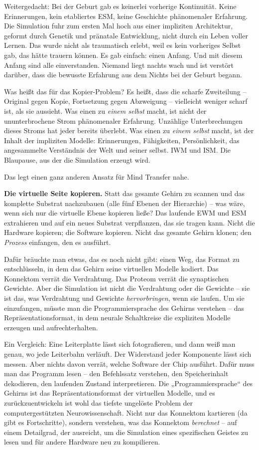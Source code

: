 \documentclass[11pt, twoside, openright]{book}
\begin{document}
Weitergedacht: Bei der Geburt gab es keinerlei vorherige Kontinuität. Keine Erinnerungen, kein etabliertes ESM, keine Geschichte phänomenaler Erfahrung. Die Simulation fuhr zum ersten Mal hoch aus einer impliziten Architektur, geformt durch Genetik und pränatale Entwicklung, nicht durch ein Leben voller Lernen. Das wurde nicht als traumatisch erlebt, weil es kein vorheriges Selbst gab, das hätte trauern können. Es gab einfach: einen Anfang. Und mit diesem Anfang sind alle einverstanden. Niemand liegt nachts wach und ist verstört darüber, dass die bewusste Erfahrung aus dem Nichts bei der Geburt begann.

Was heißt das für das Kopier-Problem? Es heißt, dass die scharfe Zweiteilung -- Original gegen Kopie, Fortsetzung gegen Abzweigung -- vielleicht weniger scharf ist, als sie aussieht. Was einen zu \textit{einem selbst} macht, ist nicht der ununterbrochene Strom phänomenaler Erfahrung. Unzählige Unterbrechungen dieses Stroms hat jeder bereits überlebt. Was einen zu \textit{einem selbst} macht, ist der Inhalt der impliziten Modelle: Erinnerungen, Fähigkeiten, Persönlichkeit, das angesammelte Verständnis der Welt und seiner selbst. IWM und ISM. Die Blaupause, aus der die Simulation erzeugt wird.

Das legt einen ganz anderen Ansatz für Mind Transfer nahe.

\textbf{Die virtuelle Seite kopieren.} Statt das gesamte Gehirn zu scannen und das komplette Substrat nachzubauen (alle fünf Ebenen der Hierarchie) -- was wäre, wenn sich nur die virtuelle Ebene kopieren ließe? Das laufende EWM und ESM extrahieren und auf ein neues Substrat verpflanzen, das sie tragen kann. Nicht die Hardware kopieren; die Software kopieren. Nicht das gesamte Gehirn klonen; den \textit{Prozess} einfangen, den es ausführt.

Dafür bräuchte man etwas, das es noch nicht gibt: einen Weg, das Format zu entschlüsseln, in dem das Gehirn seine virtuellen Modelle kodiert. Das Konnektom verrät die Verdrahtung. Das Proteom verrät die synaptischen Gewichte. Aber die Simulation ist nicht die Verdrahtung oder die Gewichte -- sie ist das, was Verdrahtung und Gewichte \textit{hervorbringen}, wenn sie laufen. Um sie einzufangen, müsste man die Programmiersprache des Gehirns verstehen -- das Repräsentationsformat, in dem neurale Schaltkreise die expliziten Modelle erzeugen und aufrechterhalten.

Ein Vergleich: Eine Leiterplatte lässt sich fotografieren, und dann weiß man genau, wo jede Leiterbahn verläuft. Der Widerstand jeder Komponente lässt sich messen. Aber nichts davon verrät, welche Software der Chip ausführt. Dafür muss man das Programm lesen -- den Befehlssatz verstehen, den Speicherinhalt dekodieren, den laufenden Zustand interpretieren. Die „Programmiersprache“ des Gehirns ist das Repräsentationsformat der virtuellen Modelle, und es zurückzuentwickeln ist wohl das tiefste ungelöste Problem der computergestützten Neurowissenschaft. Nicht nur das Konnektom kartieren (da gibt es Fortschritte), sondern verstehen, was das Konnektom \textit{berechnet} -- auf einem Detailgrad, der ausreicht, um die Simulation eines spezifischen Geistes zu lesen und für andere Hardware neu zu kompilieren.
\end{document}
